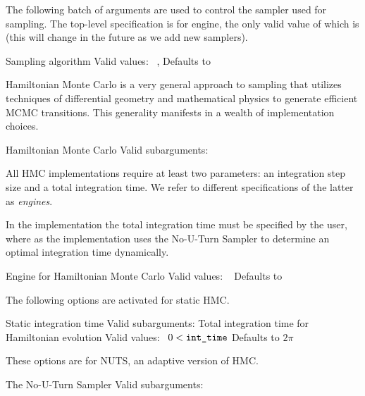 The following batch of arguments are used to control the sampler used
for sampling.  The top-level specification is for engine, the only
valid value of which is  (this will change in the future as
we add new samplers).

\begin{description}
      {Sampling algorithm}
      {Valid values: \  ,  }
      {Defaults to }
\end{description}
%
Hamiltonian Monte Carlo is a very general approach to sampling that
utilizes techniques of differential geometry and mathematical physics
to generate efficient MCMC transitions.  This generality manifests in
a wealth of implementation choices.
%
\begin{description}
        {Hamiltonian Monte Carlo}
        {Valid subarguments: }
\end{description}
%
All HMC implementations require at least two parameters: an
integration step size and a total integration time.  We refer to
different specifications of the latter as \textit{engines}.

In the  implementation the total integration time
must be specified by the user, where as the 
implementation uses the No-U-Turn Sampler to determine
an optimal integration time dynamically.
%
\begin{description}
          {Engine for Hamiltonian Monte Carlo}
          {Valid values: \  }
          {Defaults to }
\end{description}
%
The following options are activated for static HMC.
%
\begin{description}
            {Static integration time}
            {Valid subarguments: }
%
              {Total integration time for Hamiltonian evolution}
              {Valid values: \  $0 < \mbox{{\tt int\_time}}$}
              {Defaults to $2\pi$}
\end{description}
%
These options are for NUTS, an adaptive version of HMC.
%
\begin{description}
            {The No-U-Turn Sampler}
            {Valid subarguments: }
%
\end{description}

